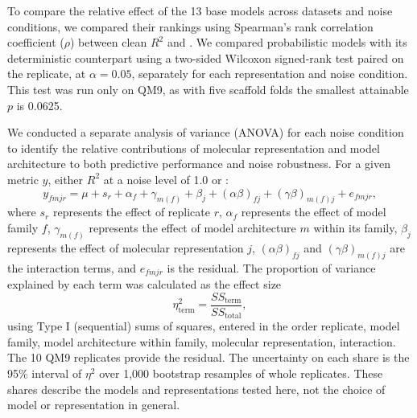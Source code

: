 To compare the relative effect of the 13 base models across datasets and noise conditions, we compared their rankings using Spearman's rank correlation coefficient ($\rho$) between clean $R^2$ and \aucnorm. We compared probabilistic models  with its deterministic counterpart using a two-sided Wilcoxon signed-rank test paired on the replicate, at $\alpha = 0.05$, separately for each representation and noise condition. This test was run only on QM9, as with five scaffold folds the
smallest attainable $p$ is 0.0625.

We conducted a separate analysis of variance (ANOVA) for each noise condition to identify the
relative contributions of molecular representation and model architecture to both predictive
performance and noise robustness. For a given metric $y$, either $R^2$ at a noise level of 1.0 or
\aucnorm:
\begin{equation}
y_{fmjr} = \mu + s_r + \alpha_f + \gamma_{m(f)} + \beta_j + (\alpha\beta)_{fj} + (\gamma\beta)_{m(f)j} + e_{fmjr},
\end{equation}
where $s_r$ represents the effect of replicate $r$, $\alpha_f$ represents the effect of model family $f$, $\gamma_{m(f)}$ represents the effect of model architecture $m$ within its family, $\beta_j$ represents the effect of
molecular representation $j$, $(\alpha\beta)_{fj}$ and $(\gamma\beta)_{m(f)j}$ are the interaction terms, and $e_{fmjr}$ is the
residual. The proportion of variance explained by each term was calculated as the
effect size
\begin{equation}
\eta^2_{\text{term}} = \frac{SS_{\text{term}}}{SS_{\text{total}}},
\end{equation}
using Type I (sequential) sums of squares, entered in the order replicate, model family, model architecture within family, molecular
representation, interaction. The 10 QM9 replicates provide the residual. The uncertainty on each share is the 95\% interval of $\eta^2$ over 1,000 bootstrap resamples of whole replicates. These shares describe the models and representations tested here, not the choice of model or representation in general. 

